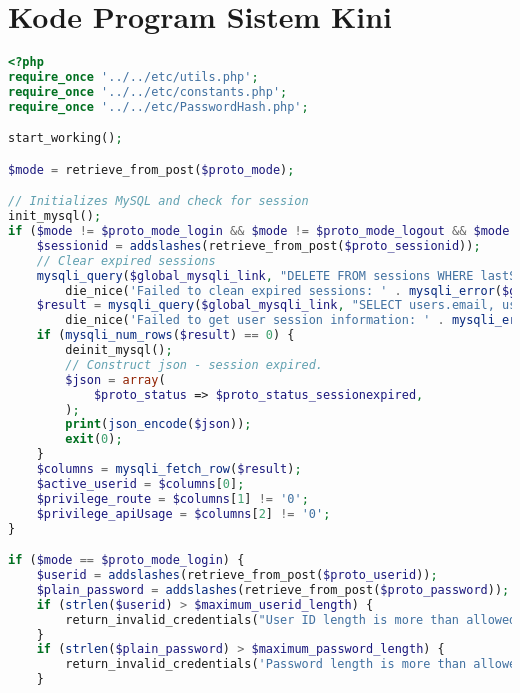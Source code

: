 \chapter{Kode Program Sistem Kini}
\label{app:A}

\singlespacing 
%
%
\begin{lstlisting}[language=PHP,basicstyle=\tiny,caption=handle.php,label={lst:handle.php}]
<?php
require_once '../../etc/utils.php';
require_once '../../etc/constants.php';
require_once '../../etc/PasswordHash.php';

start_working();

$mode = retrieve_from_post($proto_mode);

// Initializes MySQL and check for session
init_mysql();
if ($mode != $proto_mode_login && $mode != $proto_mode_logout && $mode != $proto_mode_register) {
	$sessionid = addslashes(retrieve_from_post($proto_sessionid));
	// Clear expired sessions
	mysqli_query($global_mysqli_link, "DELETE FROM sessions WHERE lastSeen < (NOW() - INTERVAL $session_expiry_interval_mysql)") or
		die_nice('Failed to clean expired sessions: ' . mysqli_error($global_mysqli_link), true);
	$result = mysqli_query($global_mysqli_link, "SELECT users.email, users.privilegeRoute, users.privilegeApiUsage FROM users LEFT JOIN sessions ON users.email = sessions.email WHERE sessions.sessionId = '$sessionid'") or
		die_nice('Failed to get user session information: ' . mysqli_error($global_mysqli_link), true);
	if (mysqli_num_rows($result) == 0) {
		deinit_mysql();
		// Construct json - session expired.
		$json = array(
			$proto_status => $proto_status_sessionexpired,
		);
		print(json_encode($json));
		exit(0);
	}
	$columns = mysqli_fetch_row($result);
	$active_userid = $columns[0]; 
	$privilege_route = $columns[1] != '0';
	$privilege_apiUsage = $columns[2] != '0';
}

if ($mode == $proto_mode_login) {
	$userid = addslashes(retrieve_from_post($proto_userid));
	$plain_password = addslashes(retrieve_from_post($proto_password));
	if (strlen($userid) > $maximum_userid_length) {
		return_invalid_credentials("User ID length is more than allowed (". strlen($userid) . ')');
	}
	if (strlen($plain_password) > $maximum_password_length) {
		return_invalid_credentials('Password length is more than allowed ('. strlen($password) . ')');
	}


\end{lstlisting}
